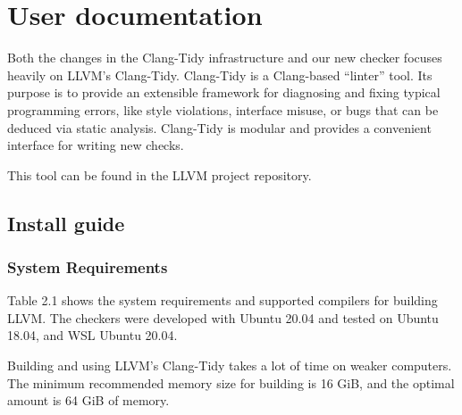 \chapter{User documentation}
\label{ch:user}

Both the changes in the Clang-Tidy infrastructure and our new checker focuses heavily on LLVM's Clang-Tidy.
Clang-Tidy is a Clang-based \CC{} “linter” tool. Its purpose is to provide an extensible framework for diagnosing and fixing
typical programming errors, like style violations, interface misuse, or bugs that can be deduced via static analysis.
Clang-Tidy is modular and provides a convenient interface for writing new checks. %

This tool can be found in the LLVM project repository. %

\section{Install guide}

\subsection{System Requirements}

Table 2.1 shows the system requirements and supported compilers for building
LLVM. The checkers were developed with Ubuntu 20.04 and tested on Ubuntu 18.04, and WSL Ubuntu 20.04.

Building and using LLVM's Clang-Tidy takes a lot of time on weaker computers. The minimum recommended memory size
for building is 16 GiB, and the optimal amount is 64 GiB of memory. %


